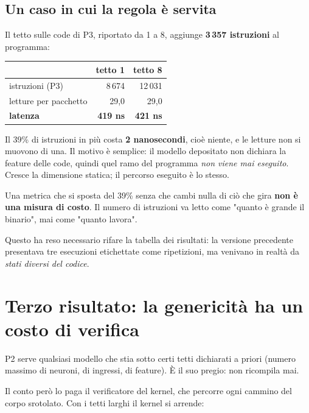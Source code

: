 \documentclass[11pt,a4paper,oneside]{report}
\begin{document}
\subsection*{Un caso in cui la regola è servita}

Il tetto sulle code di P3, riportato da 1 a 8, aggiunge \textbf{3\,357
istruzioni} al programma:

\begin{center}
\small
\begin{tabular}{@{}lrr@{}}
\toprule
& \textbf{tetto 1} & \textbf{tetto 8} \\
\midrule
istruzioni (P3) & 8\,674 & 12\,031 \\
letture per pacchetto & 29,0 & 29,0 \\
\textbf{latenza} & \textbf{419 ns} & \textbf{421 ns} \\
\bottomrule
\end{tabular}
\end{center}

Il 39\% di istruzioni in più costa \textbf{2 nanosecondi}, cioè niente, e le
letture non si muovono di una. Il motivo è semplice: il modello depositato non
dichiara la feature delle code, quindi quel ramo del programma \emph{non viene
mai eseguito}. Cresce la dimensione statica; il percorso eseguito è lo stesso.

\begin{lezione}
Una metrica che si sposta del 39\% senza che cambi nulla di ciò che gira
\textbf{non è una misura di costo}. Il numero di istruzioni va letto come
"quanto è grande il binario", mai come "quanto lavora".
\end{lezione}

Questo ha reso necessario rifare la tabella dei risultati: la versione
precedente presentava tre esecuzioni etichettate come ripetizioni, ma venivano
in realtà da \emph{stati diversi del codice}.

\section{Terzo risultato: la genericità ha un costo di verifica}

P2 serve qualsiasi modello che stia sotto certi tetti dichiarati a priori
(numero massimo di neuroni, di ingressi, di feature). È il suo pregio: non
ricompila mai.

Il conto però lo paga il verificatore del kernel, che percorre ogni cammino del
corpo srotolato. Con i tetti larghi il kernel si arrende:
\end{document}
